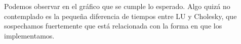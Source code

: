 Podemos observar en el gráfico que se cumple lo esperado. Algo quizá no contemplado es la pequeña diferencia de tiempos entre LU y Cholesky, que sospechamos fuertemente que está relacionada con la forma en que los implementamos.



